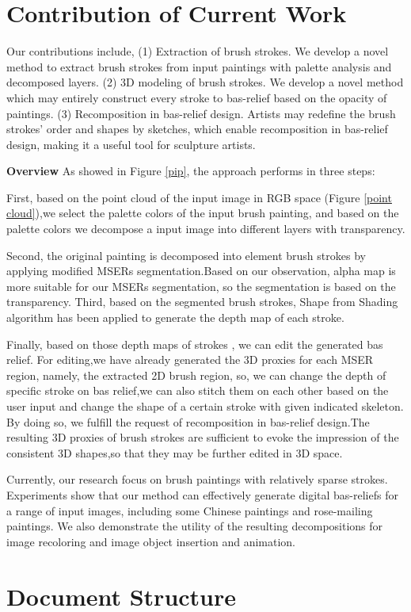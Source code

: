 \section{Contribution of Current Work}
Our contributions include,
\newline
(1) Extraction of brush strokes. We develop a novel method to extract brush strokes from input paintings with palette analysis and decomposed layers.
\newline
(2) 3D modeling of brush strokes. We develop a novel method which may entirely construct every stroke to bas-relief based on the opacity of paintings.
\newline
(3) Recomposition in bas-relief design. Artists may redefine the brush strokes’ order and shapes by sketches, which enable recomposition in bas-relief design, making it a useful tool for sculpture artists.

\textbf{Overview}  As showed in Figure \ref{pip}, the approach performs in three steps:

First, based on the point cloud of the input image in RGB space (Figure \ref{point cloud}),we select the palette colors of the input brush painting, and based on the palette colors we decompose a input image into different layers with transparency.  

Second,  the original painting is decomposed into element brush strokes by applying modified MSERs segmentation.Based on our observation, alpha map is more suitable for our MSERs segmentation, so the segmentation is based on the transparency. Third, based on the segmented brush strokes,  Shape from Shading algorithm has been applied to generate the depth map of each stroke.  

Finally, based on those depth maps of strokes , we can edit the generated bas relief. For editing,we have already generated the 3D proxies for each MSER region, namely, the extracted 2D brush region, so, we can change the depth of specific stroke on bas relief,we can also stitch them on each other based on the user input and change the shape of a certain stroke with given indicated skeleton. By doing so, we fulfill the request of recomposition in bas-relief design.The resulting 3D proxies of brush strokes are sufficient to evoke the impression of the consistent 3D shapes,so that they may be further edited in 3D space. 

Currently, our research focus on brush paintings with relatively sparse strokes. Experiments show that our method can effectively generate digital bas-reliefs for a range of input images, including some Chinese paintings and rose-mailing paintings. We also demonstrate the utility of the resulting decompositions for image recoloring and image object insertion and animation.

\section{Document Structure}


\newpage